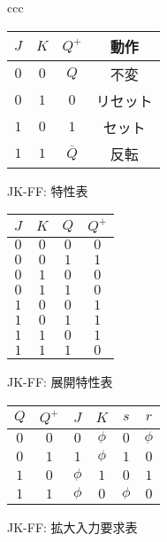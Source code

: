 \documentclass{jsarticle}
\newcommand\subcaption[1]{\begin{center}#1\end{center}}
\begin{document}
\begin{table}[htbp]
\begin{center}
\begin{tabular}{ccc}


\begin{minipage}{0.3\hsize}
\begin{center}
\begin{tabular}{cc|c||c}
\hline
$J$ & $K$ & $Q^{+}$ & 動作 \\ \hline
$0$ & $0$ & $Q$ & 不変 \\
$0$ & $1$ & $0$ & リセット\\
$1$ & $0$ & $1$ & セット\\
$1$ & $1$ & $\overline{Q}$ & 反転 \\
\hline
\end{tabular} 
\subcaption{JK-FF: 特性表}
\end{center}
\end{minipage}

\begin{minipage}{0.3\hsize}
\begin{center}
\begin{tabular}{ccc|c}
\hline
$J$ & $K$ & $Q$ & $Q^{+}$ \\ \hline
$0$ & $0$ & $0$ & $0$  \\
$0$ & $0$ & $1$ & $1$  \\
$0$ & $1$ & $0$ & $0$  \\
$0$ & $1$ & $1$ & $0$  \\
$1$ & $0$ & $0$ & $1$  \\
$1$ & $0$ & $1$ & $1$  \\
$1$ & $1$ & $0$ & $1$  \\
$1$ & $1$ & $1$ & $0$  \\
\hline
\end{tabular} 
\subcaption{JK-FF: 展開特性表}
\end{center}
\end{minipage}

\begin{minipage}{0.3\hsize}
\begin{center}
\begin{tabular}{cc|cc||cc}
\hline
$Q$ & $Q^{+}$ & $J$ & $K$ & $s$ & $r$ \\ \hline
$0$ & $0$ & $0$ & $\phi$ & $0$ & $\phi$ \\ 
$0$ & $1$ & $1$ & $\phi$ & $1$ & $0$ \\ 
$1$ & $0$ & $\phi$ & $1$ & $0$ & $1$ \\ 
$1$ & $1$ & $\phi$ & $0$ & $\phi$ & $0$ \\ 
\hline
\end{tabular} 
\subcaption{JK-FF: 拡大入力要求表}
\end{center}
\end{minipage}


\end{tabular}
\end{center}
\end{table} 
\end{document}
